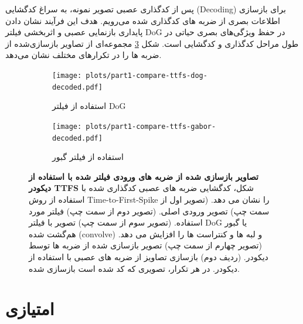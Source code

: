         پس از کدگذاری عصبی تصویر نمونه، به سراغ کدگشایی
        (Decoding)
        برای بازسازی اطلاعات بصری از ضربه های کدگذاری شده می‌رویم. هدف این فرآیند نشان دادن پایداری بازنمایی عصبی و اثربخشی فیلتر 
        DoG 
        در حفظ ویژگی‌های بصری حیاتی در طول مراحل کدگذاری و کدگشایی است. شکل
        \ref{fig:part1-compare-ttfs-filters-decoded}
        مجموعه‌ای از تصاویر بازسازی‌شده از ضربه ها را در تکرارهای مختلف نشان می‌دهد.

        \begin{figure}[!ht]
            \centering
            \begin{subfigure}[b]{\textwidth}
                \texttt{[image: plots/part1-compare-ttfs-dog-decoded.pdf]}
                \caption{استفاده از فیلتر DoG}
                \label{fig:part1-compare-ttfs-dog-decoded}
            \end{subfigure}
            \vfill %
            \begin{subfigure}[b]{\textwidth}
                \texttt{[image: plots/part1-compare-ttfs-gabor-decoded.pdf]}
                \caption{استفاده از فیلتر گبور}
                \label{fig:part1-compare-ttfs-gabor-decoded}
            \end{subfigure}
            \caption{\textbf{تصاویر بازسازی شده از ضربه های ورودی فیلتر شده با استفاده از دیکودر 
            TTFS} 
            شکل، کدگشایی ضربه های عصبی کدگذاری شده با استفاده از روش 
            Time-to-First-Spike 
            را نشان می دهد. 
            (تصویر اول از سمت چپ) 
            تصویر ورودی اصلی. 
            (تصویر دوم از سمت چپ) 
            فیلتر مورد استفاده.
            (تصویر سوم از سمت چپ)
            تصویر با فیلتر 
            DoG یا گبور
            هم‌گشت شده
            (convolve)
            و لبه ها و کنتراست ها را افزایش می دهد. 
            (تصویر چهارم از سمت چپ) 
            تصویر بازسازی شده از ضربه ها توسط دیکودر.
            (ردیف دوم)
            بازسازی تصاویز از ضربه های عصبی با استفاده از دیکودر. در هر تکرار، تصویری که کد شده است بازسازی شده.}
            \label{fig:part1-compare-ttfs-filters-decoded}
        \end{figure}


    \clearpage
    \section{امتیازی}
